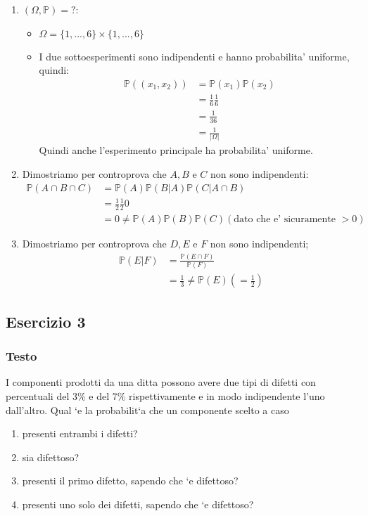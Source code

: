\begin{enumerate}[label=(\alph*)]
  \item $ (\Omega, \mathbb{P}) = ? $:
    \begin{itemize}
    \item $ \Omega = \{1,...,6\} \times \{1,...,6\} $
    \item I due sottoesperimenti sono indipendenti e hanno probabilita' uniforme, quindi:
      \begin{align*}
        \mathbb{P}((x_1, x_2)) &= \mathbb{P}(x_1)\mathbb{P}(x_2)\\
        &= \frac{1}{6}\frac{1}{6}\\
        &= \frac{1}{36}\\
        &= \frac{1}{|\Omega|}
      \end{align*}
        Quindi anche l'esperimento principale ha probabilita' uniforme.
    \end{itemize}
  \item Dimostriamo per controprova che $ A,B $ e $ C $ non sono indipendenti:
    \begin{align*}
      \mathbb{P}(A \cap B \cap C) &= \mathbb{P}(A)\mathbb{P}(B|A)\mathbb{P}(C|A \cap B)\\
      &= \frac{1}{2}\frac{1}{2}0\\
      &= 0 \neq \mathbb{P}(A)\mathbb{P}(B)\mathbb{P}(C) (\text{dato che e' sicuramente }> 0)
    \end{align*}
  \item Dimostriamo per controprova che $ D,E $ e $ F $ non sono indipendenti;
    \begin{align*}
      \mathbb{P}(E|F) &= \frac{\mathbb{P}(E \cap F)}{\mathbb{P}(F)}\\
      &= \frac{1}{3} \neq \mathbb{P}(E) (=\frac{1}{2})
    \end{align*}
\end{enumerate}

\subsection{Esercizio 3}
\subsubsection{Testo}

I componenti prodotti da una ditta possono avere due tipi di difetti con percentuali del 3\% e del 7\% rispettivamente
e in modo indipendente l’uno dall’altro. Qual ‘e la probabilit‘a che un componente scelto a caso
\begin{enumerate}[label=(\alph*)]
\item presenti entrambi i difetti?
\item sia difettoso?
\item presenti il primo difetto, sapendo che ‘e difettoso?
\item presenti uno solo dei difetti, sapendo che ‘e difettoso?
\end{enumerate}

